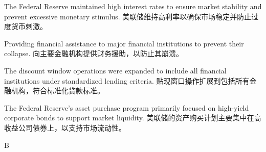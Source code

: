 \documentclass{article}
\begin{document}
\begin{choices}
    \item The Federal Reserve maintained high interest rates to ensure market stability and prevent excessive monetary stimulus.
   美联储维持高利率以确保市场稳定并防止过度货币刺激。
    \item Providing financial assistance to major financial institutions to prevent their collapse.
    向主要金融机构提供财务援助，以防止其崩溃。
    \item The discount window operations were expanded to include all financial institutions under standardized lending criteria.
    贴现窗口操作扩展到包括所有金融机构，符合标准化贷款标准。
    \item The Federal Reserve's asset purchase program primarily focused on high-yield corporate bonds to support market liquidity.
    美联储的资产购买计划主要集中在高收益公司债券上，以支持市场流动性。
\end{choices}

\begin{correctanswer}
    B
\end{correctanswer}
\end{document}
